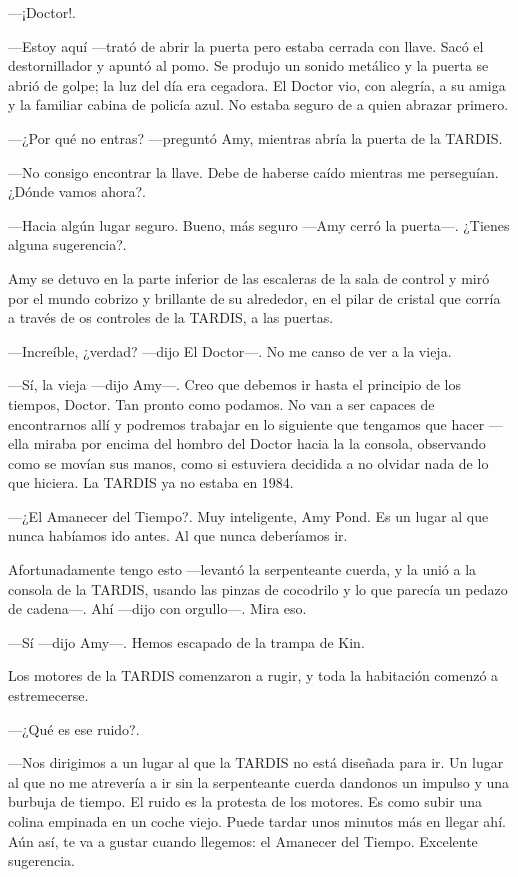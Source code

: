 ---¡Doctor!.

---Estoy aquí ---trató de abrir la puerta pero estaba cerrada con llave. Sacó el destornillador y apuntó al pomo. Se produjo un sonido metálico y la puerta se abrió de golpe; la luz del día era cegadora. El Doctor vio, con alegría, a su amiga y la familiar cabina de policía azul. No estaba seguro de a quien abrazar primero.

---¿Por qué no entras? ---preguntó Amy, mientras abría la puerta de la TARDIS.

---No consigo encontrar la llave. Debe de haberse caído mientras me perseguían. ¿Dónde vamos ahora?.

---Hacia algún lugar seguro. Bueno, más seguro ---Amy cerró la puerta---. ¿Tienes alguna sugerencia?.

Amy se detuvo en la parte inferior de las escaleras de la sala de control y miró por el mundo cobrizo y brillante de su alrededor, en el pilar de cristal que corría a través de os controles de la TARDIS, a las puertas.

---Increíble, ¿verdad? ---dijo El Doctor---. No me canso de ver a la vieja.

---Sí, la vieja ---dijo Amy---. Creo que debemos ir hasta el principio de los tiempos, Doctor. Tan pronto como podamos. No van a ser capaces de encontrarnos allí y podremos trabajar en lo siguiente que tengamos que hacer ---ella miraba por encima del hombro del Doctor hacia la la consola, observando como se movían sus manos, como si estuviera decidida a no olvidar nada de lo que hiciera. La TARDIS ya no estaba en 1984.

---¿El Amanecer del Tiempo?. Muy inteligente, Amy Pond. Es un lugar al que nunca habíamos ido antes. Al que nunca deberíamos ir.

Afortunadamente tengo esto ---levantó la serpenteante cuerda, y la unió a la consola de la TARDIS, usando las pinzas de cocodrilo y lo que parecía un pedazo de cadena---. Ahí ---dijo con orgullo---. Mira eso.

---Sí ---dijo Amy---. Hemos escapado de la trampa de Kin.

Los motores de la TARDIS comenzaron a rugir, y toda la habitación comenzó a estremecerse.

---¿Qué es ese ruido?.

---Nos dirigimos a un lugar al que la TARDIS no está diseñada para ir. Un lugar al que no me atrevería a ir sin la serpenteante cuerda dandonos un impulso y una burbuja de tiempo. El ruido es la protesta de los motores. Es como subir una colina empinada en un coche viejo. Puede tardar unos minutos más en llegar ahí. Aún así, te va a gustar cuando llegemos: el Amanecer del Tiempo. Excelente sugerencia.

